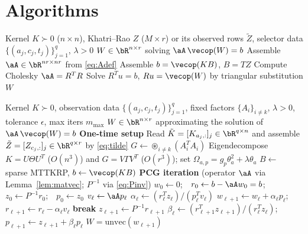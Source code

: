\section*{Algorithms}

\begin{algorithm}[h]
\caption{Direct symmetric solve of the mode-$k$ subproblem}
\label{alg:direct}
\begin{algorithmic}[1]
\Require Kernel $K\succ0$ ($n\times n$), Khatri--Rao $Z$ ($M\times r$) or its
  observed rows $\tilde Z$, selector data $\{(a_j,c_j,t_j)\}_{j=1}^q$, $\lambda>0$
\Ensure $W\in\bR^{n\times r}$ solving $\aA\,\vecop(W)=b$
\State Assemble $\aA\in\bR^{nr\times nr}$ from \eqref{eq:Adef}
\State Assemble $b=\vecop(KB)$, $B=TZ$ 
\State Compute Cholesky $\aA=R^{T}R$ 
\State Solve $R^{T}u=b$, $Ru=\vecop(W)$ by triangular substitution
\State \Return $W$
\end{algorithmic}
\end{algorithm}

\begin{algorithm}[h]
\caption{Preconditioned CG (PCG) for the mode-$k$ subproblem}
\label{alg:pcg}
\begin{algorithmic}[1]
\Require Kernel $K\succ0$, observation data $\{(a_j,c_j,t_j)\}_{j=1}^q$, fixed
  factors $\{A_i\}_{i\neq k}$, $\lambda>0$, tolerance $\epsilon$, max iters $m_{\max}$
\Ensure $W\in\bR^{n\times r}$ approximating the solution of $\aA\,\vecop(W)=b$
\Statex \textbf{One-time setup}
\State Read $\tilde K=[K_{a_j,:}]_j\in\bR^{q\times n}$ and assemble
  $\tilde Z=[Z_{c_j,:}]_j\in\bR^{q\times r}$ by \eqref{eq:tilde}
\State $G\gets \circledast_{i\neq k}(A_i^{T}A_i)$ 
\State Eigendecompose $K=U\Theta U^{T}$ ($O(n^3)$) and $G=V\Gamma V^{T}$ ($O(r^3)$);
  set $\Omega_{a,p}=g_p\theta_a^2+\lambda\theta_a$
\State $B\gets$ sparse MTTKRP, $b\gets\vecop(KB)$ 
\Statex \textbf{PCG iteration} (operator $\aA$ via Lemma~\ref{lem:matvec}; $P^{-1}$ via \eqref{eq:Pinv})
\State $w_0\gets 0$;\ \ $r_0\gets b-\aA w_0=b$;\ \ $z_0\gets P^{-1}r_0$;\ \ $p_0\gets z_0$
  \State $v_\ell\gets \aA p_\ell$ 
  \State $\alpha_\ell\gets (r_\ell^{T}z_\ell)/(p_\ell^{T}v_\ell)$
  \State $w_{\ell+1}\gets w_\ell+\alpha_\ell p_\ell$;\ \ $r_{\ell+1}\gets r_\ell-\alpha_\ell v_\ell$
   \textbf{break} \EndIf
  \State $z_{\ell+1}\gets P^{-1}r_{\ell+1}$ 
  \State $\beta_\ell\gets (r_{\ell+1}^{T}z_{\ell+1})/(r_\ell^{T}z_\ell)$;\ \ $p_{\ell+1}\gets z_{\ell+1}+\beta_\ell p_\ell$
\EndFor
\State \Return $W=\mathrm{unvec}(w_{\ell+1})$
\end{algorithmic}
\end{algorithm}

